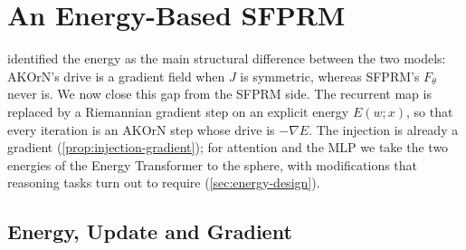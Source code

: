 \section{An Energy-Based SFPRM}
\label{sec:energy}

 identified the energy as the main structural difference between the two
models: AKOrN's drive is a gradient field when $J$ is symmetric, whereas SFPRM's $F_\theta$ never is.
We now close this gap from the SFPRM side. The recurrent map is replaced by a Riemannian gradient
step on an explicit energy $E(w;x)$, so that every iteration is an AKOrN step whose drive is
$-\nabla E$. The injection is already a gradient (\cref{prop:injection-gradient}); for attention
and the MLP we take the two energies of the Energy Transformer \citep{hoover2023et} to the sphere,
with modifications that reasoning tasks turn out to require (\cref{sec:energy-design}).

\subsection{Energy, Update and Gradient}
\label{sec:energy-def}

